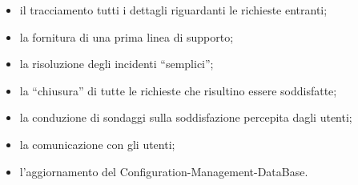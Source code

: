 \begin{itemize}
\item{il tracciamento tutti i dettagli riguardanti le richieste entranti;}
\item{la fornitura di una prima linea di supporto;}
\item{la risoluzione degli incidenti ``semplici'';}
\item{la ``chiusura'' di tutte le richieste che risultino essere soddisfatte;}
\item{la conduzione di sondaggi sulla soddisfazione percepita dagli utenti;}
\item{la comunicazione con gli utenti;}
\item{l'aggiornamento del \acf{Configuration-Management-DataBase}.}
\end{itemize}